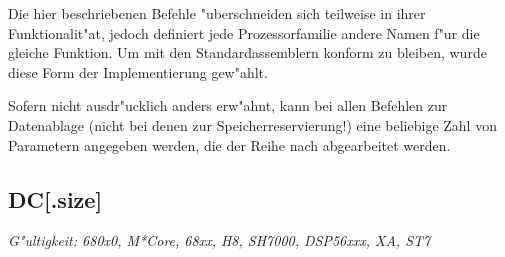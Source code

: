 \documentclass[12pt,a4paper,twoside]{report}
\makeatletter
\newcommand{\ttindex}[1]{\index{#1@{\tt #1}}}
\makeatother
\begin{document}
Die hier beschriebenen Befehle "uberschneiden sich teilweise in ihrer
Funktionalit"at, jedoch definiert jede Prozessorfamilie andere Namen
f"ur die gleiche Funktion.  Um mit den Standardassemblern konform zu
bleiben, wurde diese Form der Implementierung gew"ahlt.

Sofern nicht ausdr"ucklich anders erw"ahnt, kann bei allen Befehlen zur
Datenablage (nicht bei denen zur Speicherreservierung!) eine beliebige Zahl
von Parametern angegeben werden, die der Reihe nach abgearbeitet werden.


\subsection{DC[.size]}
\ttindex{DC}

{\em G"ultigkeit: 680x0, M*Core, 68xx, H8, SH7000, DSP56xxx, XA, ST7}
\end{document}
